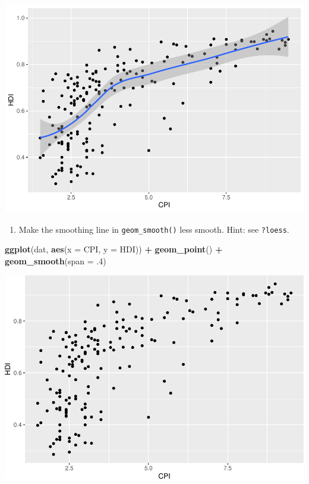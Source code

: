 \documentclass[
]{book}
\newenvironment{Shaded}{\begin{snugshade}}{\end{snugshade}}
\newcommand{\DataTypeTok}[1]{\textcolor[rgb]{0.13,0.29,0.53}{#1}}
\newcommand{\FloatTok}[1]{\textcolor[rgb]{0.00,0.00,0.81}{#1}}
\newcommand{\KeywordTok}[1]{\textcolor[rgb]{0.13,0.29,0.53}{\textbf{#1}}}
\newcommand{\NormalTok}[1]{#1}
\newcommand{\OperatorTok}[1]{\textcolor[rgb]{0.81,0.36,0.00}{\textbf{#1}}}
\newcommand{\StringTok}[1]{\textcolor[rgb]{0.31,0.60,0.02}{#1}}
\providecommand{\tightlist}{%
  \setlength{\itemsep}{0pt}\setlength{\parskip}{0pt}}
\begin{document}
\begin{alert}
\includegraphics{R/Rgraphics/figures/unnamed-chunk-193-1.pdf}

\begin{enumerate}
\def\labelenumi{\arabic{enumi}.}
\setcounter{enumi}{2}
\tightlist
\item
  Make the smoothing line in \texttt{geom\_smooth()} less smooth. Hint: see \texttt{?loess}.
\end{enumerate}

\begin{Shaded}
\begin{Highlighting}[]
\KeywordTok{ggplot}\NormalTok{(dat, }\KeywordTok{aes}\NormalTok{(}\DataTypeTok{x =}\NormalTok{ CPI, }\DataTypeTok{y =}\NormalTok{ HDI)) }\OperatorTok{+}
\StringTok{  }\KeywordTok{geom\_point}\NormalTok{() }\OperatorTok{+}
\StringTok{  }\KeywordTok{geom\_smooth}\NormalTok{(}\DataTypeTok{span =} \FloatTok{.4}\NormalTok{)}
\end{Highlighting}
\end{Shaded}

\includegraphics{R/Rgraphics/figures/unnamed-chunk-194-1.pdf}


\end{alert}
\end{document}
